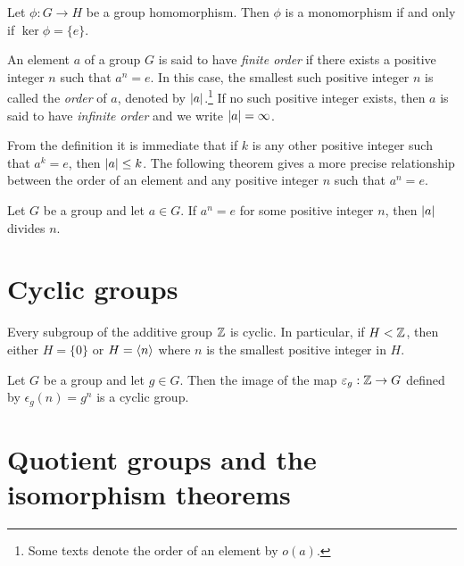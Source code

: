 \begin{theorem}
    Let \(\phi: G \to H\) be a group homomorphism. Then \(\phi\) is a monomorphism if and only if \(\ker \phi = \{e\}\).
\end{theorem}


\begin{definition}
    An element \(a\) of a group \(G\) is said to have \emph{finite order} if there exists a positive integer \(n\) such that \(a^n = e\). In this case, the smallest such positive integer \(n\) is called the \emph{order} of \(a\), denoted by \(\lvert a \rvert\).\footnote{Some texts denote the order of an element by \(o(a)\).} If no such positive integer exists, then \(a\) is said to have \emph{infinite order} and we write \(\lvert a \rvert = \infty\).
\end{definition}

\begin{remark}
    From the definition it is immediate that if \(k\) is any other positive integer such that \(a^k = e\), then \(\lvert a \rvert \leq k\). The following theorem gives a more precise relationship between the order of an element and any positive integer \(n\) such that \(a^n = e\).
\end{remark}

\begin{theorem}
    Let \(G\) be a group and let \(a \in G\). If \(a^n = e\) for some positive integer \(n\), then \(\lvert a \rvert\) divides \(n\).
\end{theorem}

\section{Cyclic groups}

\begin{theorem}
    Every subgroup of the additive group \(\mathbb{Z}\) is cyclic. In particular, if \(H < \mathbb{Z}\), then either \(H = \{0\}\) or \(H = \langle n \rangle\) where \(n\) is the smallest positive integer in \(H\).
\end{theorem}

\begin{example}
    \label{ex:exponential-image-cyclic}
    Let \(G\) be a group and let \(g \in G\). Then the image of the map \(\varepsilon_g : \mathbb{Z} \to G\) defined by \(\epsilon_g(n) = g^n\) is a cyclic group.
\end{example}

\section{Quotient groups and the isomorphism theorems}

